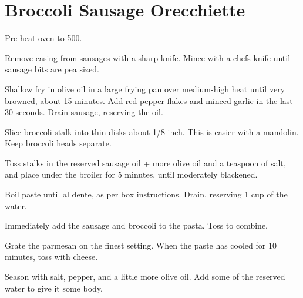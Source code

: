 \section{Broccoli Sausage Orecchiette}
\begin{recipe}



Pre-heat oven to 500\degree{}.

Remove casing from sausages with a sharp knife. Mince with a chefs knife until sausage bits are pea sized.

Shallow fry in olive oil in a large frying pan over medium-high heat until very browned, about 15 minutes.
Add red pepper flakes and minced garlic in the last 30 seconds. Drain sausage, reserving the oil.


Slice broccoli stalk into thin disks about 1/8 inch. This is easier with a mandolin. Keep broccoli heads separate.

Toss stalks in the reserved sausage oil + more olive oil and a teaspoon of salt, and place under the broiler for 5 minutes, until moderately blackened.


Boil paste until al dente, as per box instructions. Drain, reserving 1 cup of the water.

Immediately add the sausage and broccoli to the pasta. Toss to combine.


Grate the parmesan on the finest setting. When the paste has cooled for 10 minutes, toss with cheese.

Season with salt, pepper, and a little more olive oil. Add some of the reserved water to give it some body.


\end{recipe}
